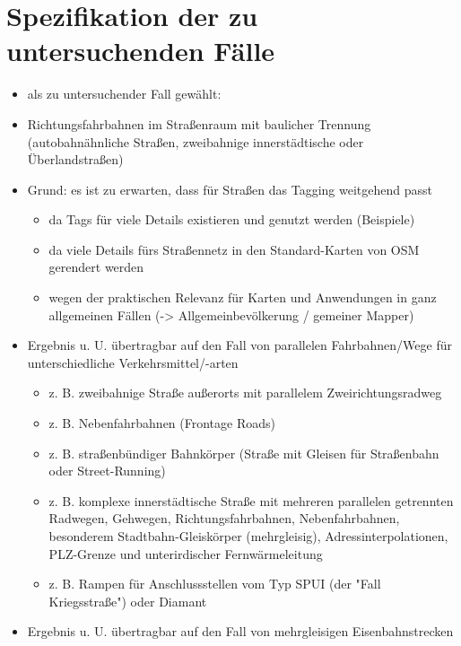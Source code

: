 \chapter{Spezifikation der zu untersuchenden Fälle}


\begin{itemize}
	
	
	\item als zu untersuchender Fall gewählt:
	
	\item Richtungsfahrbahnen im Straßenraum mit baulicher Trennung
		(autobahnähnliche Straßen, zweibahnige innerstädtische oder Überlandstraßen)
	
	\item Grund: es ist zu erwarten, dass für Straßen das Tagging weitgehend passt
	\begin{itemize}
		\item da Tags für viele Details existieren und genutzt werden (Beispiele)
		\item da viele Details fürs Straßennetz in den Standard-Karten von OSM gerendert werden
		\item wegen der praktischen Relevanz für Karten und Anwendungen in ganz allgemeinen Fällen
			(-> Allgemeinbevölkerung / gemeiner Mapper)
	\end{itemize}
	
	
	\item Ergebnis u. U. übertragbar auf den Fall von parallelen Fahrbahnen/Wege für unterschiedliche Verkehrsmittel/-arten
	\begin{itemize}
		\item z. B. zweibahnige Straße außerorts mit parallelem Zweirichtungsradweg
		\item z. B. Nebenfahrbahnen (Frontage Roads)
		\item z. B. straßenbündiger Bahnkörper (Straße mit Gleisen für Straßenbahn oder Street-Running)
		\item z. B. komplexe innerstädtische Straße mit mehreren parallelen getrennten Radwegen, Gehwegen, Richtungsfahrbahnen, Nebenfahrbahnen, besonderem Stadtbahn-Gleiskörper (mehrgleisig), Adressinterpolationen, PLZ-Grenze und unterirdischer Fernwärmeleitung
		\item z. B. Rampen für Anschlussstellen vom Typ SPUI (der "Fall Kriegsstraße") oder Diamant
	\end{itemize}
	
	\item Ergebnis u. U. übertragbar auf den Fall von mehrgleisigen Eisenbahnstrecken
	
\end{itemize}
